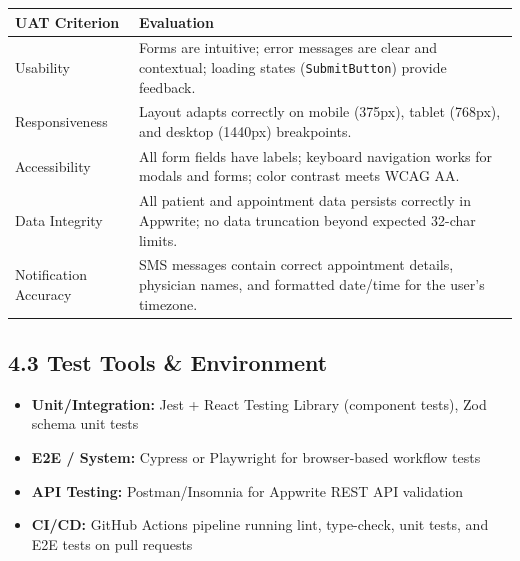 \documentclass[12pt,a4paper]{article}
\begin{document}
\begin{tabular}{@{}p{3.5cm}p{10.5cm}@{}}
\toprule
\textbf{UAT Criterion} & \textbf{Evaluation} \\
\midrule
Usability & Forms are intuitive; error messages are clear and contextual; loading states (\texttt{SubmitButton}) provide feedback. \\
Responsiveness & Layout adapts correctly on mobile (375px), tablet (768px), and desktop (1440px) breakpoints. \\
Accessibility & All form fields have labels; keyboard navigation works for modals and forms; color contrast meets WCAG AA. \\
Data Integrity & All patient and appointment data persists correctly in Appwrite; no data truncation beyond expected 32-char limits. \\
Notification Accuracy & SMS messages contain correct appointment details, physician names, and formatted date/time for the user's timezone. \\
\bottomrule
\end{tabular}

\vspace{6pt}

\subsection{4.3 Test Tools \& Environment}
\begin{itemize}[noitemsep, leftmargin=*]
    \item \textbf{Unit/Integration:} Jest + React Testing Library (component tests), Zod schema unit tests
    \item \textbf{E2E / System:} Cypress or Playwright for browser-based workflow tests
    \item \textbf{API Testing:} Postman/Insomnia for Appwrite REST API validation
    \item \textbf{CI/CD:} GitHub Actions pipeline running lint, type-check, unit tests, and E2E tests on pull requests
\end{itemize}
\end{document}
